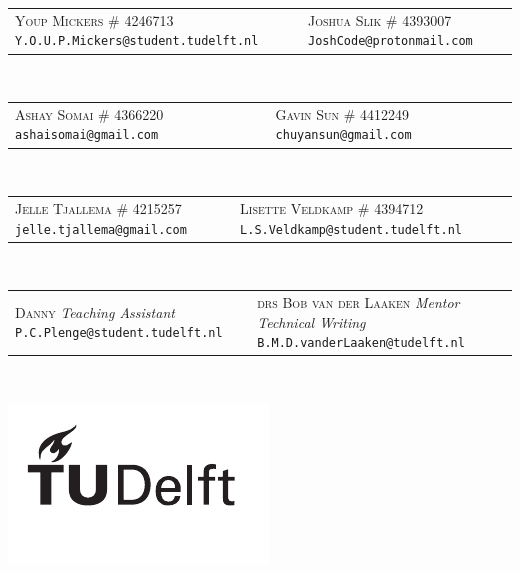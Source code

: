 \begin{titlepage}
\begin{center}
		\begin{tabular}{C{7cm} C{7cm}}
			\textsc{Youp Mickers} \newline
				\textsc{\# 4246713} \newline
				\texttt{Y.O.U.P.Mickers@student.tudelft.nl}	&
			\textsc{Joshua Slik} \newline
				\textsc{\# 4393007} \newline
				\texttt{JoshCode@protonmail.com}
		\end{tabular}
		\\[2mm]
		\begin{tabular}{C{7cm} C{7cm}}
			\textsc{Ashay Somai} \newline
				\textsc{\# 4366220} \newline
				\texttt{ashaisomai@gmail.com}	&
			\textsc{Gavin Sun} \newline
				\textsc{\# 4412249} \newline
				\texttt{chuyansun@gmail.com}
		\end{tabular}
		\\[2mm]
		\begin{tabular}{C{7cm} C{7cm}}
			\textsc{Jelle Tjallema} \newline
				\textsc{\# 4215257} \newline
				\texttt{jelle.tjallema@gmail.com}	&
			\textsc{Lisette Veldkamp} \newline
				\textsc{\# 4394712} \newline
				\texttt{L.S.Veldkamp@student.tudelft.nl}
		\end{tabular}
		\\[8mm]
		\begin{tabular}{C{7cm} C{7cm}}
			\textsc{Danny} \newline
				\textsl{Teaching Assistant} \newline
				\texttt{P.C.Plenge@student.tudelft.nl} &
			\textsc{drs Bob van der Laaken} \newline
				\textsl{Mentor Technical Writing} \newline
				\texttt{B.M.D.vanderLaaken@tudelft.nl}
		\end{tabular}
		\\[2mm]
	\end{center}
	\vfill
	\includegraphics{./contents/graphics/TU_Deflt_Logo_Black.pdf}
\end{titlepage}